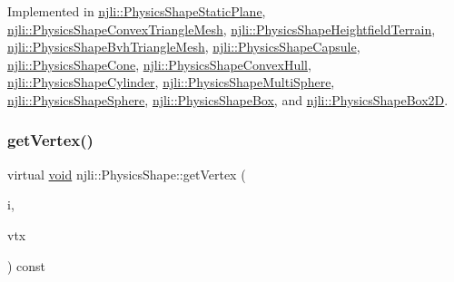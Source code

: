 Implemented in \mbox{\hyperlink{classnjli_1_1_physics_shape_static_plane_a2ca386d4ea821161f51aedf153581c16}{njli\+::\+Physics\+Shape\+Static\+Plane}}, \mbox{\hyperlink{classnjli_1_1_physics_shape_convex_triangle_mesh_a6e9b5aaac0e31b354e53058d0a5da73c}{njli\+::\+Physics\+Shape\+Convex\+Triangle\+Mesh}}, \mbox{\hyperlink{classnjli_1_1_physics_shape_heightfield_terrain_a5f6609da87c315d169df2f85908f15ab}{njli\+::\+Physics\+Shape\+Heightfield\+Terrain}}, \mbox{\hyperlink{classnjli_1_1_physics_shape_bvh_triangle_mesh_a559022a1d5b28e604abf671607ca2527}{njli\+::\+Physics\+Shape\+Bvh\+Triangle\+Mesh}}, \mbox{\hyperlink{classnjli_1_1_physics_shape_capsule_a7eaa51f833cedddc3f70ee71ce83fc41}{njli\+::\+Physics\+Shape\+Capsule}}, \mbox{\hyperlink{classnjli_1_1_physics_shape_cone_ae5cf0a39440a5d46dbb8cae82a73c794}{njli\+::\+Physics\+Shape\+Cone}}, \mbox{\hyperlink{classnjli_1_1_physics_shape_convex_hull_a000cd31104b2c03cb68652d59d39a214}{njli\+::\+Physics\+Shape\+Convex\+Hull}}, \mbox{\hyperlink{classnjli_1_1_physics_shape_cylinder_a512461c5827b246cdd5e037b2dc38d7c}{njli\+::\+Physics\+Shape\+Cylinder}}, \mbox{\hyperlink{classnjli_1_1_physics_shape_multi_sphere_abfd5533159ecea36c3f9147b49dfe7c2}{njli\+::\+Physics\+Shape\+Multi\+Sphere}}, \mbox{\hyperlink{classnjli_1_1_physics_shape_sphere_a04a15e2a5226fdc9b920750b3d9b6af8}{njli\+::\+Physics\+Shape\+Sphere}}, \mbox{\hyperlink{classnjli_1_1_physics_shape_box_af078fddd3770d7c3846ef74d00d613e1}{njli\+::\+Physics\+Shape\+Box}}, and \mbox{\hyperlink{classnjli_1_1_physics_shape_box2_d_a1fd8c07d99fd3cbd64a94c3030c0d5d5}{njli\+::\+Physics\+Shape\+Box2D}}.

\mbox{\label{classnjli_1_1_physics_shape_acb05a16bdbfa5cee6dcbab5c253eb78e}} 
\subsubsection{\texorpdfstring{get\+Vertex()}{getVertex()}}
{\footnotesize\ttfamily virtual \mbox{\hyperlink{_thread_8h_af1e856da2e658414cb2456cb6f7ebc66}{void}} njli\+::\+Physics\+Shape\+::get\+Vertex (\begin{DoxyParamCaption}\item[{int}]{i,  }\item[{bt\+Vector3 \&}]{vtx }\end{DoxyParamCaption}) const\hspace{0.3cm}{\ttfamily [pure virtual]}}

